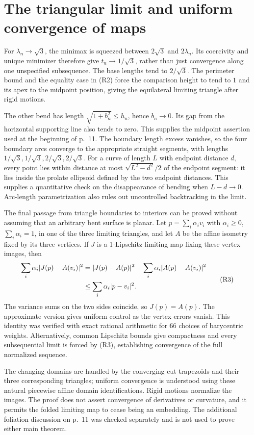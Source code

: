\documentclass[10pt]{article}
\begin{document}
\section*{The triangular limit and uniform convergence of maps}
For \(\lambda_n\to\sqrt3\), the minimax is squeezed between \(2\sqrt3\) and \(2\lambda_n\). Its coercivity and unique minimizer therefore give \(t_n\to1/\sqrt3\), rather than just convergence along one unspecified subsequence. The base lengths tend to \(2/\sqrt3\). The perimeter bound and the equality case in (R2) force the comparison height to tend to \(1\) and its apex to the midpoint position, giving the equilateral limiting triangle after rigid motions.\par
The other bend has length \(\sqrt{1+b_n^2}\le h_n\), hence \(b_n\to0\). Its gap from the horizontal supporting line also tends to zero. This supplies the midpoint assertion used at the beginning of p. 11. The boundary length excess vanishes, so the four boundary arcs converge to the appropriate straight segments, with lengths \(1/\sqrt3,1/\sqrt3,2/\sqrt3,2/\sqrt3\). For a curve of length \(L\) with endpoint distance \(d\), every point lies within distance at most \(\sqrt{L^2-d^2}/2\) of the endpoint segment: it lies inside the prolate ellipsoid defined by the two endpoint distances. This supplies a quantitative check on the disappearance of bending when \(L-d\to0\). Arc-length parametrization also rules out uncontrolled backtracking in the limit.\par
The final passage from triangle boundaries to interiors can be proved without assuming that an arbitrary bent surface is planar. Let \(p=\sum_i\alpha_i v_i\) with \(\alpha_i\ge0\), \(\sum_i\alpha_i=1\), in one of the three limiting triangles, and let \(A\) be the affine isometry fixed by its three vertices. If \(J\) is a 1-Lipschitz limiting map fixing these vertex images, then \[\begin{aligned}
 \sum_i\alpha_i|J(p)-A(v_i)|^2
 &=|J(p)-A(p)|^2+
       \sum_i\alpha_i|A(p)-A(v_i)|^2\notag\\
 &\le \sum_i\alpha_i|p-v_i|^2.
 \end{aligned}\tag{R3}\] The variance sums on the two sides coincide, so \(J(p)=A(p)\). The approximate version gives uniform control as the vertex errors vanish. This identity was verified with exact rational arithmetic for 66 choices of barycentric weights. Alternatively, common Lipschitz bounds give compactness and every subsequential limit is forced by (R3), establishing convergence of the full normalized sequence.\par
The changing domains are handled by the converging cut trapezoids and their three corresponding triangles; uniform convergence is understood using these natural piecewise affine domain identifications. Rigid motions normalize the images. The proof does not assert convergence of derivatives or curvature, and it permits the folded limiting map to cease being an embedding. The additional foliation discussion on p. 11 was checked separately and is not used to prove either main theorem.\par
\end{document}
